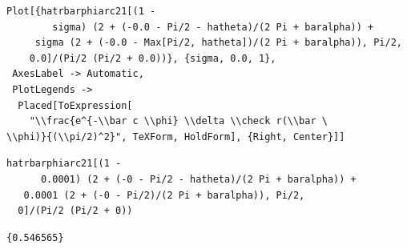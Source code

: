 \documentclass[reqno]{amsart}
\theoremstyle{definition} \newtheorem{definition}{Definition}[section]
\theoremstyle{definition} \newtheorem{remark}[definition]{Remark}
\theoremstyle{plain} \newtheorem{lemma}[definition]{Lemma}
\theoremstyle{plain} \newtheorem{proposition}[definition]{Proposition}
\theoremstyle{plain} \newtheorem{theorem}[definition]{Theorem}
\theoremstyle{plain} \newtheorem{corollary}[definition]{Corollary}
\theoremstyle{definition} \newtheorem{example}[definition]{Example}
\theoremstyle{plain} \newtheorem{claim}[clai]{Claim}
\theoremstyle{definition} \newtheorem{assumption}[definition]{Assumption}
\theoremstyle{definition} \newtheorem{observation}[definition]{Observation}
\newcommand{\1}{\mathbbm 1}
\newcommand{\sbig}{\bigskip}
\numberwithin{equation}{section} %
\theoremstyle{plain} \newtheorem*{theorem*}{Theorem}
\theoremstyle{plain} \newtheorem{mthm}[maintheorem]{Main Theorem}
\theoremstyle{plain} \newtheorem*{mthm*}{Main Theorem}
\theoremstyle{plain} \newtheorem*{conjecture*}{Conjecture}
\theoremstyle{plain} \newtheorem{conjecture}[definition]{Conjecture}
\theoremstyle{plain} \newtheorem*{problem*}{Problem}
\begin{document}
\begin{verbatim}
Plot[{hatrbarphiarc21[(1 - 
        sigma) (2 + (-0.0 - Pi/2 - hatheta)/(2 Pi + baralpha)) + 
     sigma (2 + (-0.0 - Max[Pi/2, hatheta])/(2 Pi + baralpha)), Pi/2, 
    0.0]/(Pi/2 (Pi/2 + 0.0))}, {sigma, 0.0, 1}, 
 AxesLabel -> Automatic, 
 PlotLegends -> 
  Placed[ToExpression[
    "\\frac{e^{-\\bar c \\phi} \\delta \\check r(\\bar \
\\phi)}{(\\pi/2)^2}", TeXForm, HoldForm], {Right, Center}]]
\end{verbatim}
\begin{verbatim}
hatrbarphiarc21[(1 - 
      0.0001) (2 + (-0 - Pi/2 - hatheta)/(2 Pi + baralpha)) + 
   0.0001 (2 + (-0 - Pi/2)/(2 Pi + baralpha)), Pi/2, 
  0]/(Pi/2 (Pi/2 + 0))
\end{verbatim}
\begin{verbatim}
{0.546565}
\end{verbatim}

\sbig
\end{document}
